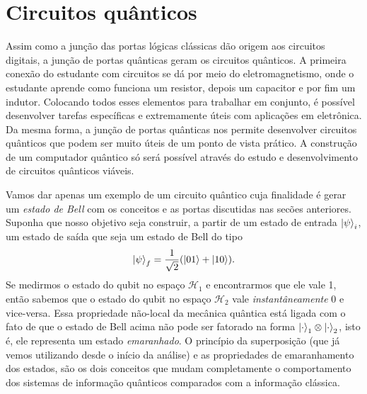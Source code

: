 \documentclass{article}
\begin{document}
\section{Circuitos quânticos}

Assim como a junção das portas lógicas clássicas dão origem aos circuitos digitais, a junção de portas quânticas geram os circuitos quânticos. A primeira conexão do estudante com circuitos se dá por meio do eletromagnetismo, onde o estudante aprende como funciona um resistor, depois um capacitor e por fim um indutor. Colocando todos esses elementos para trabalhar em conjunto, é possível desenvolver tarefas específicas e extremamente úteis com aplicações em eletrônica. Da mesma forma, a junção de portas quânticas nos permite desenvolver circuitos quânticos que podem ser muito úteis de um ponto de vista prático. A construção de um computador quântico só será possível através do estudo e desenvolvimento de circuitos quânticos viáveis.

Vamos dar apenas um exemplo de um circuito quântico cuja finalidade é gerar um \textit{estado de Bell} com os conceitos e as portas discutidas nas secões anteriores. Suponha que nosso objetivo seja construir, a partir de um estado de entrada $\ket{\psi}_i$, um estado de saída que seja um estado de Bell do tipo
\begin{equation}
    \ket{\psi}_f = \frac{1}{\sqrt{2}}(\ket{01} + \ket{10}).
\end{equation}
Se medirmos o estado do qubit no espaço $\mathcal{H}_1$ e encontrarmos que ele vale 1, então sabemos que o estado do qubit no espaço $\mathcal{H}_2$ vale \textit{instantâneamente} 0 e vice-versa. Essa propriedade não-local da mecânica quântica está ligada com o fato de que o estado de Bell acima não pode ser fatorado na forma $\ket{\cdot}_1 \otimes \ket{\cdot}_2$, isto é, ele representa um estado \textit{emaranhado}. O princípio da superposição (que já vemos utilizando desde o início da análise) e as propriedades de emaranhamento dos estados, são os dois conceitos que mudam completamente o comportamento dos sistemas de informação quânticos comparados com a informação clássica.
\end{document}
